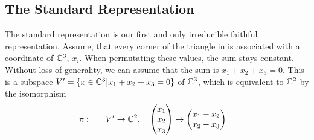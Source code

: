 \subsection{The Standard Representation}
\label{sec:ex.stand}

The standard representation is our first and only irreducible faithful representation.
Assume, that every corner of the triangle in  is associated with a coordinate of $\mathbb{C}^3$, $x_i$.
When permutating these values, the sum stays constant.
Without loss of generality, we can assume that the sum is $x_1 + x_2 + x_3 = 0$.
This is a subspace $V' = \{x \in \mathbb{C}^3 | x_1 + x_2 + x_3 = 0\}$ of $\mathbb{C}^3$, which is equivalent to $\mathbb{C}^2$ by the isomorphism
\begin{align}
    \pi: \qquad & V' \to \mathbb{C}^2, \quad \begin{pmatrix}
        x_1 \\ x_2 \\ x_3
    \end{pmatrix} \mapsto \begin{pmatrix}
        x_1 - x_2 \\
        x_2 - x_3
    \end{pmatrix}
\end{align}

